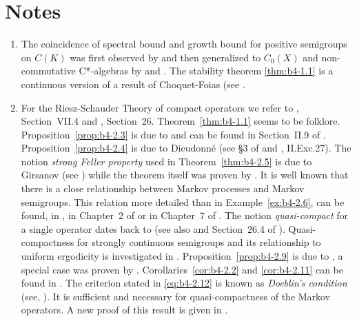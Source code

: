 \section*{Notes}

\begin{enumerate}[label=\emph{Section \arabic*:}, wide, itemsep=1ex]

\item
 The coincidence of spectral bound and growth bound for positive semigroups on $C(K)$ was first observed by \citet{derndinger:1980} and then generalized to $C_0(X)$ and non-commutative C*-algebras by \citet{battydavies:1983} and \citet{grohneubrander:1981}. 
The stability theorem \ref{thm:b4-1.1} is a continuous version of a result of Choquet-Foias (see 
\citet[V.8.8]{schaefer:1974}.

\item
 For the Riesz-Schauder Theory of compact operators we refer to \citet{dunfordschwartz:1958}, Section~VII.4 and \citet{pietsch:1978}, Section~26. 
Theorem~\ref{thm:b4-1.1} seems to be folklore. Proposition~\ref{prop:b4-2.3} is due to \citet{grothendieck:1953} and can be found in Section~II.9 of \citet{schaefer:1974}. Proposition~\ref{prop:b4-2.4} is due to Dieudonné (see §3 of \citet{grothendieck:1953} and \citet{schaefer:1974}, II.Exc.27). The notion \emph{strong Feller property} used in Theorem~\ref{thm:b4-2.5} is due to Girsanov (see \citet{dynkin:1965}) while the theorem itself was proven by \citet{davies:1982}. 
It is well known that there is a close relationship between Markov processes and Markov semigroups. 
This relation more detailed than in Example~\ref{ex:b4-2.6}, can be found, \eg in \citet{dynkin:1965}, in Chapter~2 of \citet{vancasteren:1985} or in Chapter~7 of \citet{lamperti:1977}. 
The notion \emph{quasi-compact} for a single operator dates back to \citet{eberlein:1948} (see also \citet{yosidakakutani:1941} and Section~26.4 of \citet{pietsch:1978}). 
Quasi-compactness for strongly continuous semigroups and its relationship to uniform ergodicity is investigated in \citet{lin:1975}. 
Proposition~\ref{prop:b4-2.9} is due to \citet{voigt:1980}, a special case was proven by \citet{vidav:1970}. 
Corollaries~\ref{cor:b4-2.2} and \ref{cor:b4-2.11} can be found in   \citet{greiner:1984}.
The criterion stated in \eqref{eq:b4-2.12} is known as \emph{Doeblin's condition} (see, \eg \citet{yosidakakutani:1941}). It is sufficient and
necessary for quasi-compactness of the Markov operators. 
A new proof of this result is given in \citet{lotz:1981}.


\end{enumerate}
